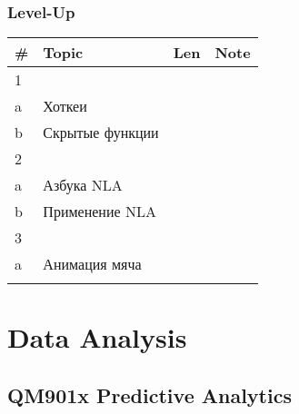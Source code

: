 \documentclass[a4paper,12pt]{article} %
\begin{document}
\subsubsection{Level-Up}
\begin{longtable}{|l|p{11cm}|l|l|}
	\hline
	\# & Topic & Len & Note \\
	\hline
	1 &  &  &  \\
	a & Хоткеи &  &  \\
	b & Скрытые функции &  &  \\
	\hline
	2 &  &  &  \\
	a & Азбука NLA &  &  \\
	b & Применение NLA &  &  \\
	\hline
	3 &  &  &  \\
	a & Анимация мяча &  &  \\
	\hline
	&  &  &  \\
	\hline
\end{longtable}


\newpage
\section{Data Analysis}
\subsection{QM901x Predictive Analytics}
\end{document}
